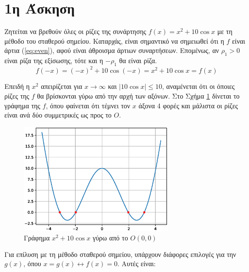 \documentclass[assignment2.tex]{subfiles}
\begin{document}
\section*{1η Άσκηση}
Ζητείται να βρεθούν όλες οι ρίζες της συνάρτησης $f(x)=x^2 + 10\cos x$ με τη μέθοδο του σταθερού σημείου. Καταρχάς, είναι σημαντικό να σημειωθεί ότι η $f$ είναι άρτια (\ref{eq:even}), αφού είναι άθροισμα άρτιων συναρτήσεων. Επομένως, αν $\rho_1>0$ είναι ρίζα της εξίσωσης, τότε και η $-\rho_1$ θα είναι ρίζα.
\begin{equation}
f(-x) = (-x)^2 + 10 \cos (-x) = x^2 + 10 \cos x = f(x)
\label{eq:even}
\end{equation} 

Επειδή η $x^2$ απειρίζεται για $x\rightarrow \infty$ και $|10\cos x|\leq 10$, αναμένεται ότι οι όποιες ρίζες της $f$ θα βρίσκονται γύρω από την αρχή των αξόνων. Στο Σχήμα \ref{fig:f1} δίνεται το γράφημα της $f$, όπου φαίνεται ότι τέμνει τον $x$ άξονα 4 φορές και μάλιστα οι ρίζες είναι ανά δύο συμμετρικές ως προς το $O$.
\begin{figure}[hp]
\includegraphics[width=0.7\textwidth]{f1.eps}
\centering
\caption{Γράφημα $x^2+10\cos x$ γύρω από το $O(0,0)$}
\label{fig:f1}
\end{figure} 

Για επίλυση με τη μέθοδο σταθερού σημείου, υπάρχουν διάφορες επιλογές για την $g(x)$, όπου $x=g(x)\leftrightarrow f(x)=0$. Αυτές είναι:
\end{document}
